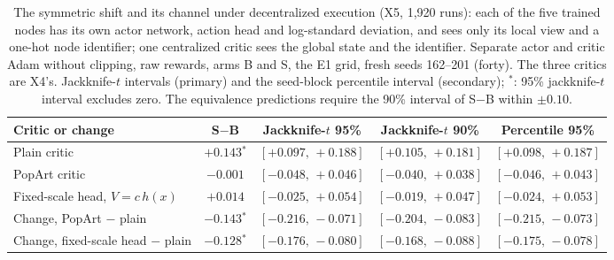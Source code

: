 \begin{table}[!htbp]
\caption{The symmetric shift and its channel under decentralized execution (X5, 1,920 runs): each of the five trained nodes has its own actor network, action head and log-standard deviation, and sees only its local view and a one-hot node identifier; one centralized critic sees the global state and the identifier. Separate actor and critic Adam without clipping, raw rewards, arms B and S, the E1 grid, fresh seeds 162--201 (forty). The three critics are X4's. Jackknife-$t$ intervals (primary) and the seed-block percentile interval (secondary); $^{\ast}$: 95\% jackknife-$t$ interval excludes zero. The equivalence predictions require the 90\% interval of S$-$B within $\pm0.10$.}
\label{tab:x5}
\centering\footnotesize
\begin{tabular}{@{}>{\raggedright\arraybackslash}p{}cccc@{}}
\toprule
Critic or change & S$-$B & Jackknife-$t$ 95\% & Jackknife-$t$ 90\% & Percentile 95\% \\
\midrule
Plain critic & $+0.143$$^{\ast}$ & $[+0.097,\,+0.188]$ & $[+0.105,\,+0.181]$ & $[+0.098,\,+0.187]$ \\
PopArt critic & $-0.001$ & $[-0.048,\,+0.046]$ & $[-0.040,\,+0.038]$ & $[-0.046,\,+0.043]$ \\
Fixed-scale head, $V=c\,h(x)$ & $+0.014$ & $[-0.025,\,+0.054]$ & $[-0.019,\,+0.047]$ & $[-0.024,\,+0.053]$ \\
Change, PopArt $-$ plain & $-0.143$$^{\ast}$ & $[-0.216,\,-0.071]$ & $[-0.204,\,-0.083]$ & $[-0.215,\,-0.073]$ \\
Change, fixed-scale head $-$ plain & $-0.128$$^{\ast}$ & $[-0.176,\,-0.080]$ & $[-0.168,\,-0.088]$ & $[-0.175,\,-0.078]$ \\
\bottomrule
\end{tabular}
\end{table}
